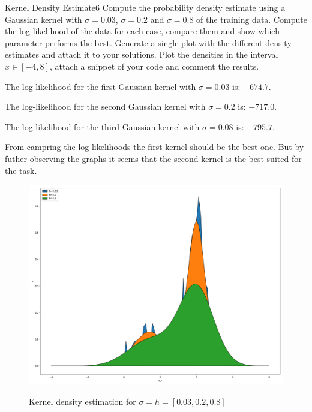 \begin{questions}

\begin{question}{Kernel Density Estimate}{6}
Compute the probability density estimate using a Gaussian kernel with $\sigma=0.03$, $\sigma=0.2$ and $\sigma=0.8$ of the training data. Compute the log-likelihood of the data for each case, compare them and show which parameter performs the best.
Generate a single plot with the different density estimates and attach it to your solutions. Plot the densities in the interval $x \in [-4,8]$, attach a snippet of your code and comment the results.

\begin{answer}
The log-likelihood for the first Gaussian kernel with $\sigma = 0.03$ is: $-674.7$. 

The log-likelihood for the second Gaussian kernel with $\sigma = 0.2$ is: $-717.0$. 

The log-likelihood for the third Gaussian kernel with $\sigma = 0.08$ is: $-795.7$. 

From campring the log-likelihoods the first kernel should be the best one. But by futher observing the graphs it seems that the second kernel is the best suited for the task.
\end{answer}
\end{question}

\begin{figure}[!h]
	\includegraphics[width=0.8\linewidth]{pictures/kdplot.png}
	\centering
	\label{kd}
	\caption{Kernel density estimation for $\sigma = h = [0.03, 0.2, 0.8]$}
\end{figure}


\end{questions}
